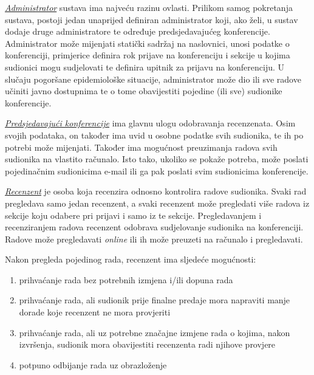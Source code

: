 		\underline{\textit{Administrator}} sustava ima najveću razinu ovlasti. Prilikom samog pokretanja sustava, postoji jedan unaprijed definiran administrator koji, ako želi, u sustav dodaje druge administratore te određuje predsjedavajućeg konferencije. Administrator može mijenjati statički sadržaj na naslovnici, unosi podatke o konferenciji, primjerice definira rok prijave na konferenciju i sekcije u kojima sudionici mogu sudjelovati te definira upitnik za prijavu na konferenciju. U slučaju pogoršane epidemiološke situacije, administrator može dio ili sve radove učiniti javno dostupnima te o tome obavijestiti pojedine (ili sve) sudionike konferencije.
		
		
		\underline{\textit{Predsjedavajući konferencije}} ima glavnu ulogu odobravanja recenzenata. Osim svojih podataka, on također ima uvid u osobne podatke svih sudionika, te ih po potrebi može mijenjati. Također ima mogućnost preuzimanja radova svih sudionika na vlastito računalo. Isto tako, ukoliko se pokaže potreba, može poslati pojedinačnim sudionicima e-mail ili ga pak poslati svim sudionicima konferencije. 
		
		
		\underline{\textit{Recenzent}} je osoba koja recenzira odnosno kontrolira radove sudionika. Svaki rad pregledava samo jedan recenzent, a svaki recenzent može pregledati više radova iz sekcije koju odabere pri prijavi i samo iz te sekcije. Pregledavanjem i recenziranjem radova recenzent odobrava sudjelovanje sudionika na konferenciji. Radove može pregledavati \textit{online} ili ih može preuzeti na računalo i pregledavati. 
		
		Nakon pregleda pojedinog rada, recenzent ima sljedeće mogućnosti:
		
		\begin{enumerate}
			
			\item prihvaćanje rada bez potrebnih izmjena i/ili dopuna rada
			\item prihvaćanje rada, ali sudionik prije finalne predaje mora napraviti manje dorade koje recenzent ne mora provjeriti
			\item prihvaćanje rada, ali uz potrebne značajne izmjene rada o kojima, nakon izvršenja, sudionik mora obavijestiti recenzenta radi njihove provjere
			\item potpuno odbijanje rada uz obrazloženje
			
		\end{enumerate}
	

